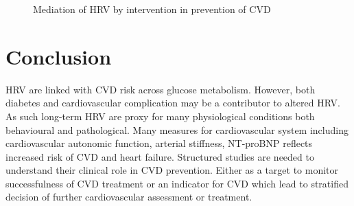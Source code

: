 \documentclass[
  a4paper,
  headsepline=true,
  open=any]{scrbook}
\begin{document}
\begin{figure}

\begin{minipage}[t]{\linewidth}

{\centering 


\caption{Mediation of HRV by intervention in prevention of CVD}

}

\end{minipage}%

\end{figure}


\hypertarget{conclusion}{%
\chapter{Conclusion}\label{conclusion}}

HRV are linked with CVD risk across glucose metabolism. However, both
diabetes and cardiovascular complication may be a contributor to altered
HRV. As such long-term HRV are proxy for many physiological conditions
both behavioural and pathological. Many measures for cardiovascular
system including cardiovascular autonomic function, arterial stiffness,
NT-proBNP reflects increased risk of CVD and heart failure. Structured
studies are needed to understand their clinical role in CVD prevention.
Either as a target to monitor successfulness of CVD treatment or an
indicator for CVD which lead to stratified decision of further
cardiovascular assessment or treatment.

\end{document}
